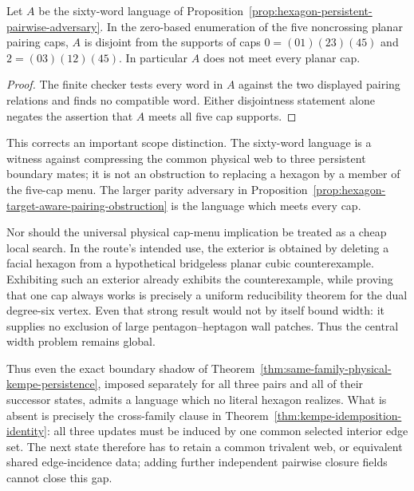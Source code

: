 \begin{proposition}
\label{prop:persistent-adversary-cap-menu}
Let $A$ be the sixty-word language of
Proposition~\ref{prop:hexagon-persistent-pairwise-adversary}.  In the
zero-based enumeration of the five noncrossing planar pairing caps, $A$ is
disjoint from the supports of caps $0=(01)(23)(45)$ and
$2=(03)(12)(45)$.  In particular $A$ does not meet every planar cap.
\end{proposition}

\begin{proof}
The finite checker tests every word in $A$ against the two displayed pairing
relations and finds no compatible word.  Either disjointness statement alone
negates the assertion that $A$ meets all five cap supports.
\end{proof}

This corrects an important scope distinction.  The sixty-word language is a
witness against compressing the common physical web to three persistent
boundary mates; it is not an obstruction to replacing a hexagon by a member
of the five-cap menu.  The larger parity adversary in
Proposition~\ref{prop:hexagon-target-aware-pairing-obstruction} is the
language which meets every cap.

Nor should the universal physical cap-menu implication be treated as a
cheap local search.  In the route's intended use, the exterior is obtained
by deleting a facial hexagon from a hypothetical bridgeless planar cubic
counterexample.  Exhibiting such an exterior already exhibits the
counterexample, while proving that one cap always works is precisely a
uniform reducibility theorem for the dual degree-six vertex.  Even that
strong result would not by itself bound width: it supplies no exclusion of
large pentagon--heptagon wall patches.  Thus the central width problem remains
global.

Thus even the exact boundary shadow of
Theorem~\ref{thm:same-family-physical-kempe-persistence}, imposed separately
for all three pairs and all of their successor states, admits a language which
no literal hexagon realizes.  What is absent is precisely the cross-family
clause in Theorem~\ref{thm:kempe-idemposition-identity}: all three updates must
be induced by one common selected interior edge set.  The next state therefore
has to retain a common trivalent web, or equivalent shared edge-incidence
data; adding further independent pairwise closure fields cannot close this
gap.


